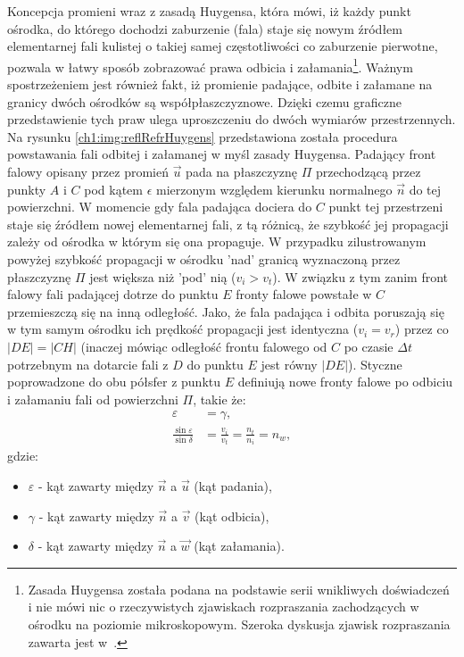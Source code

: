 Koncepcja promieni wraz z zasadą Huygensa, która mówi, iż każdy punkt ośrodka, do którego dochodzi zaburzenie (fala) staje się nowym źródłem elementarnej fali kulistej o takiej samej częstotliwości co zaburzenie pierwotne, pozwala w łatwy sposób zobrazować prawa odbicia i załamania\footnote{Zasada Huygensa została podana na podstawie serii wnikliwych doświadczeń i nie mówi nic o rzeczywistych zjawiskach rozpraszania zachodzących w ośrodku na poziomie mikroskopowym. Szeroka dyskusja zjawisk rozpraszania zawarta jest w~\cite{Hecht}. }. Ważnym spostrzeżeniem jest również fakt, iż promienie padające, odbite i załamane na granicy dwóch ośrodków są współpłaszczyznowe. Dzięki czemu graficzne przedstawienie tych praw ulega uproszczeniu do dwóch wymiarów przestrzennych.
Na rysunku \ref{ch1:img:reflRefrHuygens} przedstawiona została procedura powstawania fali odbitej i załamanej w myśl zasady Huygensa. Padający front falowy opisany przez promień $\vec{u}$ pada na płaszczyznę $\Pi$ przechodzącą przez punkty $A$ i $C$ pod kątem $\epsilon$ mierzonym względem kierunku normalnego $\vec{n}$ do tej powierzchni. W momencie gdy fala padająca dociera do $C$ punkt tej przestrzeni staje się źródłem nowej elementarnej fali, z tą różnicą, że szybkość jej propagacji zależy od ośrodka w którym się ona propaguje. W przypadku zilustrowanym powyżej szybkość propagacji w ośrodku 'nad' granicą wyznaczoną przez płaszczyznę $\Pi$ jest większa niż 'pod' nią ($v_i > v_t$). W związku z tym zanim front falowy fali padającej dotrze do punktu $E$ fronty falowe powstałe w $C$ przemieszczą się na inną odległość. Jako, że fala padająca i odbita poruszają się w tym samym ośrodku ich prędkość propagacji jest identyczna ($v_i = v_r$) przez co $|DE| = |CH|$ (inaczej mówiąc odległość frontu falowego od $C$ po czasie $\Delta t$ potrzebnym na dotarcie fali z $D$ do punktu $E$ jest równy $|DE|$). Styczne poprowadzone do obu półsfer z punktu $E$ definiują nowe fronty falowe po odbiciu i załamaniu fali od powierzchni $\Pi$, takie że:
\begin{align}
\label{ch1:eq:ReflectionLaw}
\varepsilon &= \gamma,\\
\label{ch1:eq:RefractionLaw}
\frac{\sin\varepsilon}{\sin\delta} &= \frac{v_i}{v_t} = \frac{n_t}{n_i} = n_w,
\end{align}
gdzie:
\begin{itemize}
\item[] $\varepsilon$ - kąt zawarty między $\vec{n}$ a $\vec{u}$ (kąt padania),
\item[] $\gamma$ - kąt zawarty między $\vec{n}$ a $\vec{v}$ (kąt odbicia),
\item[] $\delta$ - kąt zawarty między $\vec{n}$ a $\vec{w}$ (kąt załamania).
\end{itemize}
